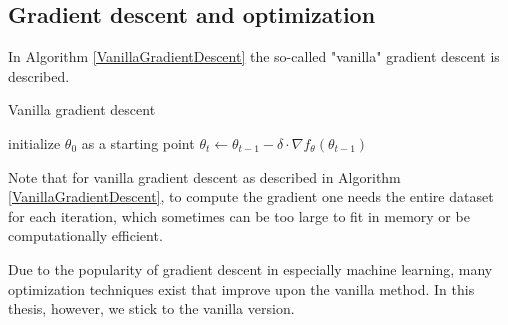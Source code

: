 \subsection{Gradient descent and optimization}
In Algorithm \ref{VanillaGradientDescent} the so-called "vanilla" gradient descent is described.
\begin{algorithm}[H]
    \caption{Vanilla gradient descent} \label{VanillaGradientDescent}
\begin{algorithmic}[1]
    \State initialize $\theta_0$ as a starting point
    \State $\theta_t \gets \theta_{t-1} - \delta \cdot \nabla f_{\theta} (\theta_{t-1})$
    \EndWhile
\end{algorithmic}
\end{algorithm}

Note that for vanilla gradient descent as described in Algorithm \ref{VanillaGradientDescent}, to compute the gradient one needs the entire dataset for each iteration,
which sometimes can be too large to fit in memory or be computationally efficient.

Due to the popularity of gradient descent in especially machine learning, many optimization techniques exist that improve upon the vanilla method.
In this thesis, however, we stick to the vanilla version.
